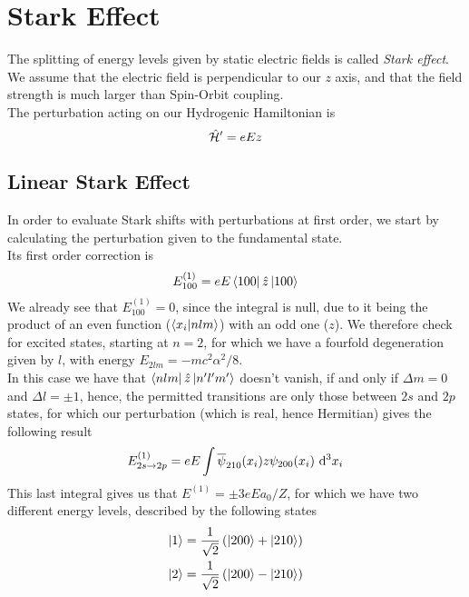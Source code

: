 \documentclass[../qm.tex]{subfiles}
\begin{document}
	\section{Stark Effect}
	The splitting of energy levels given by static electric fields is called \textit{Stark effect}. We assume that the electric field is perpendicular to our $z$ axis, and that the field strength is much larger than Spin-Orbit coupling.\\
	The perturbation acting on our Hydrogenic Hamiltonian is
	\begin{equation}
		\opr{\ham}'=eEz
		\label{eq:starkpert}
	\end{equation}
	\subsection{Linear Stark Effect}
	In order to evaluate Stark shifts with perturbations at first order, we start by calculating the perturbation given to the fundamental state.\\
	Its first order correction is
	\begin{equation}
		E^{(1)}_{100}=eE\bra{100}\opr{z}\ket{100}
		\label{eq:starkgs}
	\end{equation}
	We already see that $E^{(1)}_{100}=0$, since the integral is null, due to it being the product of an even function ($\bra{x_i}\ket{nlm}$) with an odd one ($z$). We therefore check for excited states, starting at $n=2$, for which we have a fourfold degeneration given by $l$, with energy $E_{2lm}=-mc^2\alpha^2/8$.\\
	In this case we have that $\bra{nlm}\hat{z}\ket{n'l'm'}$ doesn't vanish, if and only if $\Delta m=0$ and $\Delta l=\pm1$, hence, the permitted transitions are only those between $2s$ and $2p$ states, for which our perturbation (which is real, hence Hermitian) gives the following result
	\begin{equation}
		E^{(1)}_{2s\to2p}=eE\int\cc{\psi}_{210}(x_i)z\psi_{200}(x_i)\diff[3]{x_i}
		\label{eq:energyshiftstarkeff}
	\end{equation}
	This last integral gives us that $E^{(1)}=\pm3eEa_0/Z$, for which we have two different energy levels, described by the following states
	\begin{equation}
		\begin{aligned}
			\ket{1}&=\frac{1}{\sqrt{2}}\left( \ket{200}+\ket{210} \right)\\
			\ket{2}&=\frac{1}{\sqrt{2}}\left( \ket{200}-\ket{210} \right)
		\end{aligned}
		\label{eq:eigenstateslinearstark}
	\end{equation}
\end{document}
